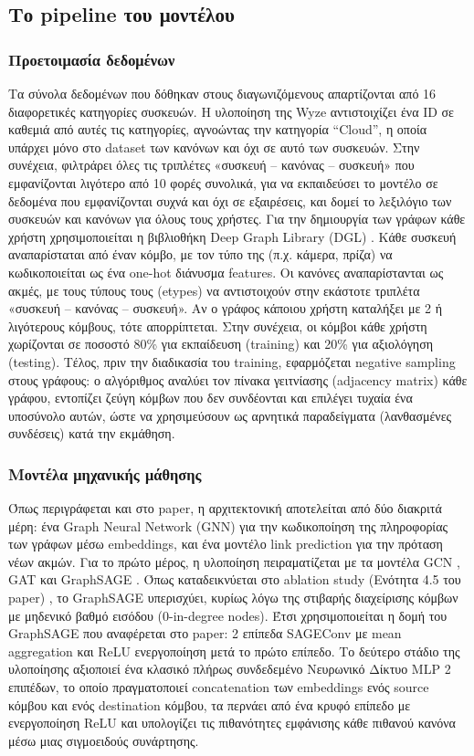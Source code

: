 \subsection{Το pipeline του μοντέλου}\label{ssec:pipeline}
\subsubsection{Προετοιμασία δεδομένων}
Τα σύνολα δεδομένων που δόθηκαν στους διαγωνιζόμενους απαρτίζονται από 16 διαφορετικές κατηγορίες συσκευών. Η υλοποίηση της Wyze αντιστοιχίζει ένα ID σε καθεμιά από αυτές τις κατηγορίες, αγνοώντας την κατηγορία “Cloud”, η οποία υπάρχει μόνο στο dataset των κανόνων και όχι σε αυτό των συσκευών. Στην συνέχεια, φιλτράρει όλες τις τριπλέτες «συσκευή – κανόνας – συσκευή» που εμφανίζονται λιγότερο από 10 φορές συνολικά, για να εκπαιδεύσει το μοντέλο σε δεδομένα που εμφανίζονται συχνά και όχι σε εξαιρέσεις, και δομεί το λεξιλόγιο των συσκευών και κανόνων για όλους τους χρήστες. Για την δημιουργία των γράφων κάθε χρήστη χρησιμοποιείται η βιβλιοθήκη Deep Graph Library (DGL) \cite{wang_deep_2019, dgl_software}. Κάθε συσκευή αναπαρίσταται από έναν κόμβο, με τον τύπο της (π.χ. κάμερα, πρίζα) να κωδικοποιείται ως ένα one-hot διάνυσμα features. Οι κανόνες αναπαρίστανται ως ακμές, με τους τύπους τους (etypes) να αντιστοιχούν στην εκάστοτε τριπλέτα «συσκευή – κανόνας – συσκευή». Αν ο γράφος κάποιου χρήστη καταλήξει με 2 ή λιγότερους κόμβους, τότε απορρίπτεται. Στην συνέχεια, οι κόμβοι κάθε χρήστη χωρίζονται σε ποσοστό 80\% για εκπαίδευση (training) και 20\% για αξιολόγηση (testing). Τέλος, πριν την διαδικασία του training, εφαρμόζεται negative sampling στους γράφους: ο αλγόριθμος αναλύει τον πίνακα γειτνίασης (adjacency matrix) κάθε γράφου, εντοπίζει ζεύγη κόμβων που δεν συνδέονται και επιλέγει τυχαία ένα υποσύνολο αυτών, ώστε να χρησιμεύσουν ως αρνητικά παραδείγματα (λανθασμένες συνδέσεις) κατά την εκμάθηση.

\subsubsection{Μοντέλα μηχανικής μάθησης}
Όπως περιγράφεται και στο paper, η αρχιτεκτονική αποτελείται από δύο διακριτά μέρη: ένα Graph Neural Network (GNN) για την κωδικοποίηση της πληροφορίας των γράφων μέσω embeddings, και ένα μοντέλο link prediction για την πρόταση νέων ακμών. Για το πρώτο μέρος, η υλοποίηση πειραματίζεται με τα μοντέλα GCN \cite{kipf_semi-supervised_2017}, GAT \cite{velickovic_graph_2018} και GraphSAGE \cite{hamilton_inductive_2017}. Όπως καταδεικνύεται στο ablation study (Ενότητα 4.5 του paper) \cite{yao_fedrule_2022}, το GraphSAGE υπερισχύει, κυρίως λόγω της στιβαρής διαχείρισης κόμβων με μηδενικό βαθμό εισόδου (0-in-degree nodes). Έτσι χρησιμοποιείται η δομή του GraphSAGE που αναφέρεται στο paper: 2 επίπεδα SAGEConv με mean aggregation και ReLU ενεργοποίηση μετά το πρώτο επίπεδο. Το δεύτερο στάδιο της υλοποίησης αξιοποιεί ένα κλασικό πλήρως συνδεδεμένο Νευρωνικό Δίκτυο MLP 2 επιπέδων, το οποίο πραγματοποιεί concatenation των embeddings ενός source κόμβου και ενός destination κόμβου, τα περνάει από ένα κρυφό επίπεδο με ενεργοποίηση ReLU και υπολογίζει τις πιθανότητες εμφάνισης κάθε πιθανού κανόνα μέσω μιας σιγμοειδούς συνάρτησης.

